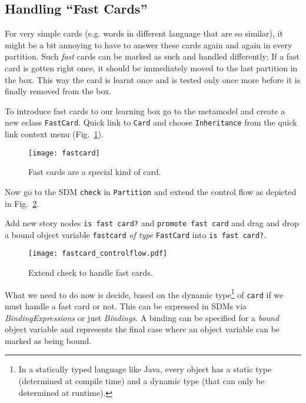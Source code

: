 \subsection{Handling ``Fast Cards''}

For very simple cards (e.g. words in different language that are so similar), it might be a bit annoying to have to answer these cards again and again in every
partition. Such \emph{fast} cards can be marked as such and handled differently:  If a fast card is gotten right once, it should be immediately moved to the
last partition in the box. This way the card is learnt once and is tested only once more before it is finally removed from the box.

To introduce fast cards to our learning box go to the metamodel and create a new eclass \texttt{FastCard}. Quick link to \texttt{Card} and choose
\texttt{Inheritance} from the quick link context menu (Fig.~\ref{fig:sdm_fastcard_1}).

\begin{figure}[htp]
\begin{center}
  \texttt{[image: fastcard]}
  \caption{Fast cards are a special kind of card.}  
  \label{fig:sdm_fastcard_1}
\end{center}
\end{figure}

Now go to the SDM \texttt{check} in \texttt{Partition} and extend the control flow as depicted in Fig.~\ref{fig:sdm_fastcard_2}.
 
Add new story nodes \texttt{is fast card?} and \texttt{promote fast card} and drag and drop a bound object variable \texttt{fastcard} \emph{of type}
\texttt{FastCard} into \texttt{is fast card?}.

\begin{figure}[htbp]
\begin{center}
  \texttt{[image: fastcard\_controlflow.pdf]}
  \caption{Extend check to handle fast cards.}  
  \label{fig:sdm_fastcard_2}
\end{center}
\end{figure}

What we need to do now is decide, based on the dynamic type\footnote{In a statically typed language like Java, every object has a static type (determined at
compile time) and a dynamic type (that can only be determined at runtime).} of \texttt{card} if we must handle a fast card or not. This can be expressed in SDMs
via \emph{BindingExpressions} or just \emph{Bindings}. A binding can be specified for a \emph{bound} object variable  and represents the final
case where an object variable can be marked as being bound.


